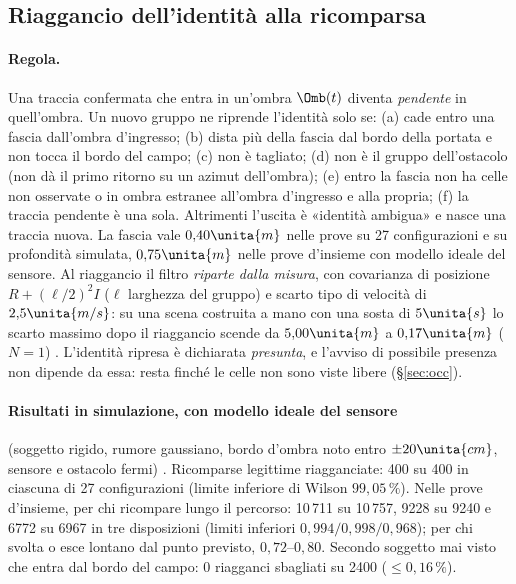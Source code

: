\subsection{Riaggancio dell'identità alla ricomparsa}\label{sec:sti-riaggancio}

\paragraph{Regola.} Una traccia confermata che entra in un'ombra $\Omb(t)$ diventa \emph{pendente} in quell'ombra. Un nuovo gruppo ne riprende l'identità solo se: (a) cade entro una fascia dall'ombra d'ingresso; (b) dista più della fascia dal bordo della portata e non tocca il bordo del campo; (c) non è tagliato; (d) non è il gruppo dell'ostacolo (non dà il primo ritorno su un azimut dell'ombra); (e) entro la fascia non ha celle non osservate o in ombra estranee all'ombra d'ingresso e alla propria; (f) la traccia pendente è una sola. Altrimenti l'uscita è «identità ambigua» e nasce una traccia nuova. La fascia vale $0{,}40\unita{m}$ nelle prove su 27 configurazioni e su profondità simulata, $0{,}75\unita{m}$ nelle prove d'insieme con modello ideale del sensore. Al riaggancio il filtro \emph{riparte dalla misura}, con covarianza di posizione $R+(\ell/2)^2I$ ($\ell$ larghezza del gruppo) e scarto tipo di velocità di $2{,}5\unita{m/s}$: su una scena costruita a mano con una sosta di $5\unita{s}$ lo scarto massimo dopo il riaggancio scende da $5{,}00\unita{m}$ a $0{,}17\unita{m}$ ($N=1$) . L'identità ripresa è dichiarata \emph{presunta}, e l'avviso di possibile presenza non dipende da essa: resta finché le celle non sono viste libere (\S\ref{sec:occ}).

\paragraph{Risultati in simulazione, con modello ideale del sensore} (soggetto rigido, rumore gaussiano, bordo d'ombra noto entro $\pm20\unita{cm}$, sensore e ostacolo fermi) . Ricomparse legittime riagganciate: 400 su 400 in ciascuna di 27 configurazioni (limite inferiore di Wilson $99{,}05\,\%$). Nelle prove d'insieme, per chi ricompare lungo il percorso: 10\,711 su 10\,757, 9228 su 9240 e 6772 su 6967 in tre disposizioni (limiti inferiori $0{,}994/0{,}998/0{,}968$); per chi svolta o esce lontano dal punto previsto, $0{,}72$--$0{,}80$. Secondo soggetto mai visto che entra dal bordo del campo: 0 riagganci sbagliati su 2400 ($\le0{,}16\,\%$).

